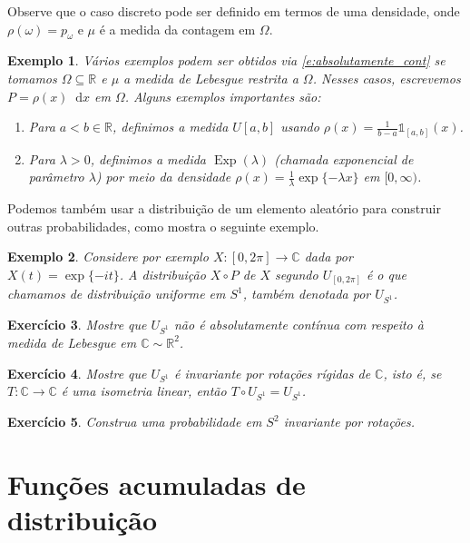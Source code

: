 \documentclass[reqno, draft]{book}
\newcommand*\1{\mathds{1}}
\newtheorem{example}{Exemplo}[section]
\newtheorem{exercise}[example]{Exercício}
\DeclareMathOperator{\Exp}{Exp}
\renewcommand*\d{\mathop{}\!\mathrm{d}}
\begin{document}
Observe que o caso discreto pode ser definido em termos de uma densidade, onde $\rho(\omega) = p_\omega$ e $\mu$ é a medida da contagem em $\Omega$.

\begin{example}
  Vários exemplos podem ser obtidos via \eqref{e:absolutamente_cont} se tomamos $\Omega \subseteq \mathbb{R}$ e $\mu$ a medida de Lebesgue restrita a $\Omega$.
  Nesses casos, escrevemos $P = \rho(x) \d x$ em $\Omega$.
  Alguns exemplos importantes são:
  \begin{enumerate}[\quad a)]
  \item Para $a < b \in \mathbb{R}$, definimos a medida $U[a,b]$  usando $\rho(x) = \tfrac{1}{b-a}\1_{[a,b]}(x)$.
  \item Para $\lambda > 0$, definimos a medida $\Exp(\lambda)$  (chamada exponencial de parâmetro $\lambda$) por meio da densidade $\rho(x) = \tfrac{1}{\lambda} \exp\{-\lambda x\}$ em $[0,\infty)$.
  \end{enumerate}
\end{example}

Podemos também usar a distribuição de um elemento aleatório para construir outras probabilidades, como mostra o seguinte exemplo.

\begin{example}
  Considere por exemplo $X:[0,2\pi] \to \mathbb{C}$ dada por $X(t) = \exp\{-i t\}$.
  A distribuição $X \circ P$ de $X$ segundo $U_{[0,2\pi]}$ é o que chamamos de distribuição uniforme em $S^1$, também denotada por $U_{S^1}$.
\end{example}

\begin{exercise}
  Mostre que $U_{S^1}$ não é absolutamente contínua com respeito à medida de Lebesgue em $\mathbb{C} \sim \mathbb{R}^2$.
\end{exercise}

\begin{exercise}
  Mostre que $U_{S^1}$ é invariante por rotações rígidas de $\mathbb{C}$, isto é, se $T:\mathbb{C} \to \mathbb{C}$ é uma isometria linear, então $T \circ U_{S^1} = U_{S^1}$.
\end{exercise}

\begin{exercise}
  Construa uma probabilidade em $S^2$ invariante por rotações.
\end{exercise}

\section{Funções acumuladas de distribuição}
\end{document}
